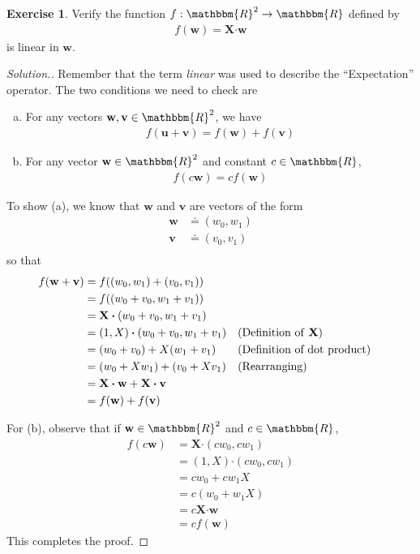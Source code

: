 \documentclass[11pt,letterpaper]{article}
\newcommand\real{\mathbbm{R}}
\numberwithin{theorem}{section}
\numberwithin{definition}{section}
\numberwithin{lemma}{section}
\numberwithin{corollary}{section}
\numberwithin{proposition}{section}
\theoremstyle{definition}
\numberwithin{remark}{section}
\numberwithin{claim}{section}
\numberwithin{observation}{section}
\numberwithin{fact}{section}
\numberwithin{assumption}{section}
\numberwithin{example}{section}
\newtheorem{exercise}[theorem]{Exercise}
\numberwithin{exercise}{section}
\begin{document}
\begin{exercise}
Verify the function $f : \real^2 \to \real$ defined by
\begin{align*}
f(\textbf{w}) = \textbf{X} \boldsymbol{\cdot} \textbf{w}
\end{align*}
is linear in $\textbf{w}$.
\end{exercise}
\begin{proof}[Solution.]
Remember that the term \textit{linear} was used to describe the ``Expectation'' operator. The two conditions we need to check are 
\begin{enumerate}[(a)]
\item For any vectors $\textbf{w},\textbf{v} \in \real^2$, we have
\begin{align*}
f(\textbf{u} + \textbf{v}) = f(\textbf{w}) + f(\textbf{v})
\end{align*} 
\item For any vector $\textbf{w} \in \real^2$ and constant $c \in \real$,
\begin{align*}
f(c\textbf{w}) = cf(\textbf{w})
\end{align*}
\end{enumerate}
To show (a), we know that $\textbf{w}$ and $\textbf{v}$ are vectors of the form
\begin{align*}
\textbf{w} &\doteq (w_0,w_1) \\
\textbf{v} &\doteq (v_0,v_1) \\
\end{align*}
so that
\begin{align*}
f(\textbf{w} + \textbf{v}) &= f((w_0, w_1) + (v_0,v_1)) \\
&= f((w_0 + v_0,w_1+v_1)) \\
&= \textbf{X} \boldsymbol{\cdot} (w_0 + v_0,w_1+v_1) \\
&= (1,X) \boldsymbol{\cdot} (w_0 + v_0,w_1+v_1) && \text{(Definition of \textbf{X})}\\
&= (w_0 + v_0) + X(w_1 + v_1) &&\text{(Definition of dot product)}\\
&= (w_0 + Xw_1) + (v_0 + Xv_1) &&\text{(Rearranging)} \\
&= \textbf{X}\boldsymbol{\cdot}\textbf{w} + \textbf{X}\boldsymbol{\cdot}\textbf{v} \\
&= f(\textbf{w}) + f(\textbf{v})
\end{align*}

For (b), observe that if $\textbf{w} \in \real^2$ and $c \in \real$,
\begin{align*}
f(c\textbf{w}) &= \textbf{X} \boldsymbol{\cdot} (cw_0,cw_1) \\
&= (1,X) \boldsymbol{\cdot} (cw_0,cw_1) \\
&= cw_0 + cw_1 X \\
&= c(w_0 + w_1X) \\
&= c \textbf{X} \boldsymbol{\cdot} \textbf{w} \\
&= cf(\textbf{w})
\end{align*}
This completes the proof.
\end{proof}
\end{document}
